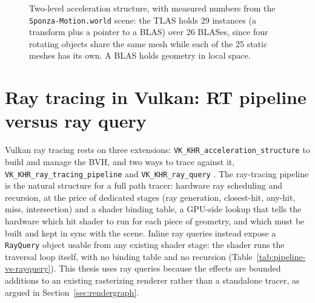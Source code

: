 \begin{figure}[tbp]
\centering
{}
\caption[Two-level acceleration structure (TLAS/BLAS)]{Two-level acceleration structure, with measured
numbers from the \texttt{Sponza-Motion.world} scene: the TLAS holds 29 instances (a transform plus a
pointer to a BLAS) over 26 BLASes, since four rotating objects share the same mesh while each of the
25 static meshes has its own. A BLAS holds geometry in local space.}
\label{fig:tlasblas}
\end{figure}

\section{Ray tracing in Vulkan: RT pipeline versus ray query}
\label{sec:vulkanrt}

Vulkan ray tracing rests on three extensions: \texttt{VK_KHR_acceleration_structure} to build and
manage the BVH, and two ways to trace against it, \texttt{VK_KHR_ray_tracing_pipeline} and
\texttt{VK_KHR_ray_query} \cite{khronos_rayquery}. The ray-tracing pipeline is the natural structure for a full path tracer:
hardware ray scheduling and recursion, at the price of dedicated stages (ray generation, closest-hit,
any-hit, miss, intersection) and a shader binding table, a GPU-side lookup that tells the hardware
which hit shader to run for each piece of geometry, and which must be built and kept in sync with the
scene. Inline ray queries
instead expose a \texttt{RayQuery} object usable from any
existing shader stage: the shader runs the traversal loop itself, with no binding table and no
recursion (Table~\ref{tab:pipeline-vs-rayquery}). This thesis uses ray queries because the effects
are bounded additions to an existing rasterizing renderer rather than a standalone tracer, as argued
in Section~\ref{sec:rendergraph}.

